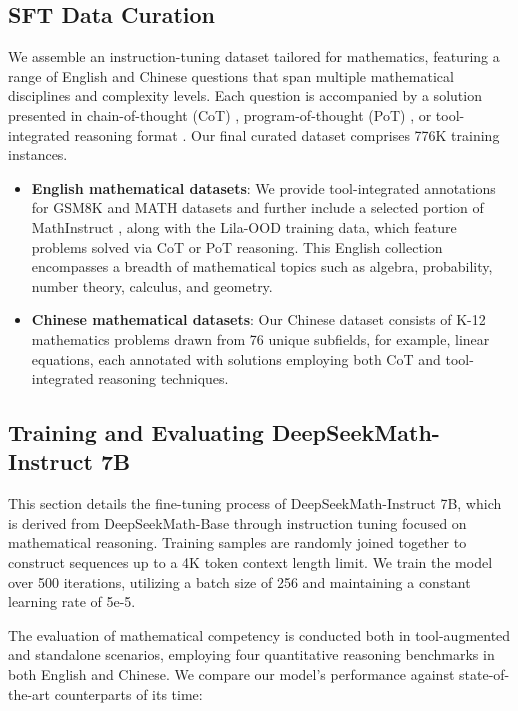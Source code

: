 \begin{itemize}[topsep=0pt]
\subsection{SFT Data Curation}

We assemble an instruction-tuning dataset tailored for mathematics, featuring a range of English and Chinese questions that span multiple mathematical disciplines and complexity levels. Each question is accompanied by a solution presented in chain-of-thought (CoT) \citep{cot}, program-of-thought (PoT) \citep{pot,pal}, or tool-integrated reasoning format \citep{tora}. Our final curated dataset comprises 776K training instances.

\begin{itemize}[topsep=0pt]
    \item \textbf{English mathematical datasets}: We provide tool-integrated annotations for GSM8K and MATH datasets and further include a selected portion of MathInstruct \citep{MathInstruct}, along with the Lila-OOD \citep{lila} training data, which feature problems solved via CoT or PoT reasoning. This English collection encompasses a breadth of mathematical topics such as algebra, probability, number theory, calculus, and geometry.
    \item \textbf{Chinese mathematical datasets}: Our Chinese dataset consists of K-12 mathematics problems drawn from 76 unique subfields, for example, linear equations, each annotated with solutions employing both CoT and tool-integrated reasoning techniques.
\end{itemize}

\subsection{Training and Evaluating DeepSeekMath-Instruct 7B}

This section details the fine-tuning process of DeepSeekMath-Instruct 7B, which is derived from DeepSeekMath-Base through instruction tuning focused on mathematical reasoning. Training samples are randomly joined together to construct sequences up to a 4K token context length limit. We train the model over 500 iterations, utilizing a batch size of 256 and maintaining a constant learning rate of 5e-5.

The evaluation of mathematical competency is conducted both in tool-augmented and standalone scenarios, employing four quantitative reasoning benchmarks in both English and Chinese. We compare our model’s performance against state-of-the-art counterparts of its time:


\end{itemize}
